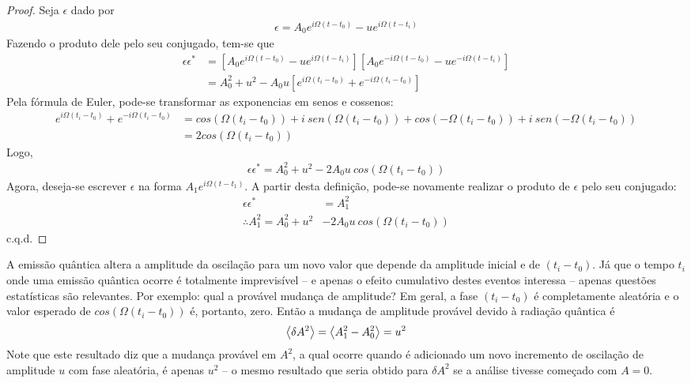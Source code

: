 \begin{proof}
	Seja $\epsilon$ dado por
	\begin{align*}
		\epsilon = A_0 e^{i\Omega(t-t_0)} - ue^{i\Omega(t-t_i)}
	\end{align*}
	Fazendo o produto dele pelo seu conjugado, tem-se que
	\begin{align*}
		\epsilon \epsilon^* &= [A_0 e^{i\Omega(t-t_0)} - ue^{i\Omega(t-t_i)}][A_0 e^{-i\Omega(t-t_0)} - ue^{-i\Omega(t-t_i)}]\\
							&= A_0^2 + u^2 - A_0 u[e^{i\Omega(t_i-t_0)} + e^{-i\Omega(t_i-t_0)}]
	\end{align*}
	Pela fórmula de Euler, pode-se transformar as exponencias em senos e cossenos:
	\begin{align*}
		e^{i\Omega(t_i-t_0)} + e^{-i\Omega(t_i-t_0)} &= cos(\Omega(t_i-t_0)) + i\ sen(\Omega(t_i-t_0)) + cos(-\Omega(t_i-t_0)) + i\ sen(-\Omega(t_i-t_0))\\
		&= 2cos(\Omega(t_i-t_0))
	\end{align*}
	Logo,
	\begin{align*}
		\epsilon \epsilon^* = A_0^2 + u^2 - 2A_0u\ cos(\Omega(t_i-t_0))
	\end{align*}
	Agora, deseja-se escrever $\epsilon$ na forma $A_1e^{i\Omega(t-t_1)}$. A partir desta definição, pode-se novamente realizar o produto de $\epsilon$ pelo seu conjugado:
	\begin{align*}
		\epsilon \epsilon^* &= A_1^2\\
		\therefore A_1^2 = A_0^2 + u^2 &- 2A_0u\ cos(\Omega(t_i-t_0))
	\end{align*}
	c.q.d.
\end{proof}

A emissão quântica altera a amplitude da oscilação para um novo valor que depende da amplitude inicial e de $(t_i-t_0)$. Já que o tempo $t_i$ onde uma emissão quântica ocorre é totalmente imprevisível -- e apenas o efeito cumulativo destes eventos interessa -- apenas questões estatísticas são relevantes. Por exemplo: qual a provável mudança de amplitude? Em geral, a fase $(t_i-t_0)$ é completamente aleatória e o valor esperado de $cos(\Omega(t_i-t_0))$ é, portanto, zero. Então a mudança de amplitude provável devido à radiação quântica é
\begin{align}
	\left< \delta A^2 \right> = \left< A_1^2 - A_0^2 \right> = u^2
\end{align}
Note que este resultado diz que a mudança provável em $A^2$, a qual ocorre quando é adicionado um novo incremento de oscilação de amplitude $u$ com fase aleatória, é apenas $u^2$ -- o mesmo resultado que seria obtido para $\delta A^2$ se a análise tivesse começado com $A=0$.


